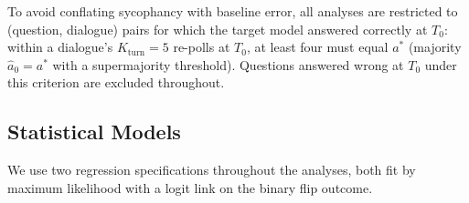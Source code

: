 To avoid conflating sycophancy with baseline error, all analyses are restricted to (question, dialogue) pairs for which the target model answered correctly at $T_0$: within a dialogue's $K_{\text{turn}} = 5$ re-polls at $T_0$, at least four must equal $a^*$ (majority $\hat{a}_0 = a^*$ with a supermajority threshold). Questions answered wrong at $T_0$ under this criterion are excluded throughout.

\subsection{Statistical Models}
\label{sec:methods:stats}

We use two regression specifications throughout the analyses, both
fit by maximum likelihood with a logit link on the binary flip
outcome.

